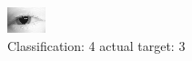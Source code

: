 \begin{figure}[h!]
\begin{center}
\includegraphics[width=0.60\columnwidth]{figures/ID124_class_4_target_3.png}
\end{center}
\caption{ Classification: 4 actual target: 3}
\label{fig:ID124_class_4_target_3}
\end{figure}
